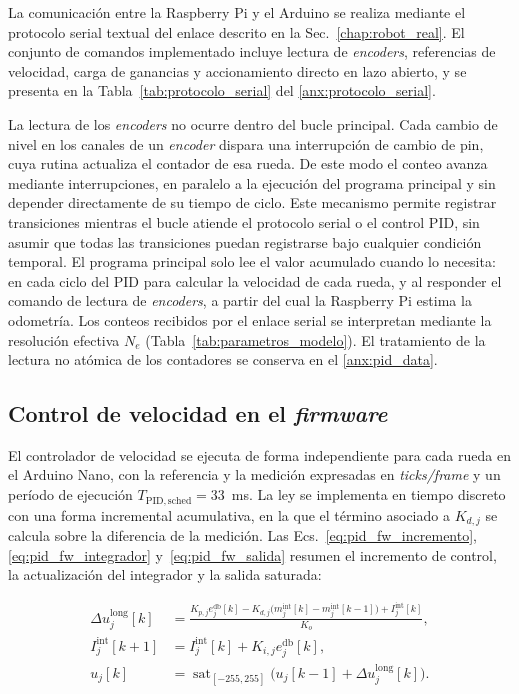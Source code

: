 La comunicación entre la Raspberry Pi y el \gls{Arduino} se realiza mediante el protocolo serial textual del enlace descrito en la Sec.~\ref{chap:robot_real}. El conjunto de comandos implementado incluye lectura de \textit{encoders}, referencias de velocidad, carga de ganancias y accionamiento directo en lazo abierto, y se presenta en la Tabla~\ref{tab:protocolo_serial} del \ref{anx:protocolo_serial}.

La lectura de los \textit{encoders} no ocurre dentro del bucle principal. Cada cambio
de nivel en los canales de un \textit{encoder} dispara una interrupción de cambio de
pin, cuya rutina actualiza el contador de esa rueda. De este modo el conteo
avanza mediante interrupciones, en paralelo a la ejecución del programa principal
y sin depender directamente de su tiempo de ciclo. Este mecanismo permite
registrar transiciones mientras el bucle atiende el protocolo serial o el control
PID, sin asumir que todas las transiciones puedan registrarse bajo cualquier
condición temporal. El programa principal solo
lee el valor acumulado cuando lo necesita: en cada ciclo del PID para calcular
la velocidad de cada rueda, y al responder el comando de lectura de \textit{encoders},
a partir del cual la Raspberry Pi estima la odometría.
Los conteos recibidos por el enlace serial se interpretan mediante la
resolución efectiva $N_e$ (Tabla~\ref{tab:parametros_modelo}). El
tratamiento de la lectura no atómica de los contadores se conserva en el
\ref{anx:pid_data}.

\subsection{Control de velocidad en el \texorpdfstring{\textit{firmware}}{firmware}}
\label{sec:motorcontrol_pid}

El controlador de velocidad se ejecuta de forma independiente para cada rueda en el Arduino Nano, con la referencia y la medición expresadas en \textit{ticks/frame} y un período de ejecución $T_{\mathrm{PID,sched}}=33$~ms. La ley se implementa en tiempo discreto con una forma incremental acumulativa, en la que el término asociado a $K_{d,j}$ se calcula sobre la diferencia de la medición. Las Ecs.~\eqref{eq:pid_fw_incremento}, \eqref{eq:pid_fw_integrador} y~\eqref{eq:pid_fw_salida} resumen el incremento de control, la actualización del integrador y la salida saturada:

\begin{align}
\Delta u_j^{\mathrm{long}}[k]
&=
\frac{
K_{p,j}e_j^{\mathrm{db}}[k]
-
K_{d,j}\bigl(m_j^{\mathrm{int}}[k]-m_j^{\mathrm{int}}[k-1]\bigr)
+
I_j^{\mathrm{int}}[k]
}{
K_o
},
\label{eq:pid_fw_incremento}\\
I_j^{\mathrm{int}}[k+1]
&=
I_j^{\mathrm{int}}[k]+K_{i,j}e_j^{\mathrm{db}}[k],
\label{eq:pid_fw_integrador}\\
u_j[k]
&=
\operatorname{sat}_{[-255,255]}
\bigl(u_j[k-1]+\Delta u_j^{\mathrm{long}}[k]\bigr).
\label{eq:pid_fw_salida}
\end{align}


